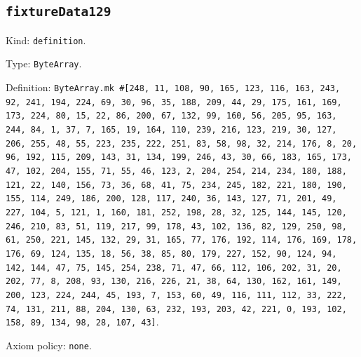\documentclass[11pt]{article}
\begin{document}
\subsection*{\texttt{fixtureData129}}
\noindent Kind: \texttt{definition}.\par
\noindent Type: \texttt{ByteArray}.\par
\noindent Definition: \texttt{ByteArray.mk \#[248, 11, 108, 90, 165, 123, 116, 163, 243, 92, 241, 194, 224, 69, 30, 96, 35, 188, 209, 44, 29, 175, 161, 169, 173, 224, 80, 15, 22, 86, 200, 67, 132, 99, 160, 56, 205, 95, 163, 244, 84, 1, 37, 7, 165, 19, 164, 110, 239, 216, 123, 219, 30, 127, 206, 255, 48, 55, 223, 235, 222, 251, 83, 58, 98, 32, 214, 176, 8, 20, 96, 192, 115, 209, 143, 31, 134, 199, 246, 43, 30, 66, 183, 165, 173, 47, 102, 204, 155, 71, 55, 46, 123, 2, 204, 254, 214, 234, 180, 188, 121, 22, 140, 156, 73, 36, 68, 41, 75, 234, 245, 182, 221, 180, 190, 155, 114, 249, 186, 200, 128, 117, 240, 36, 143, 127, 71, 201, 49, 227, 104, 5, 121, 1, 160, 181, 252, 198, 28, 32, 125, 144, 145, 120, 246, 210, 83, 51, 119, 217, 99, 178, 43, 102, 136, 82, 129, 250, 98, 61, 250, 221, 145, 132, 29, 31, 165, 77, 176, 192, 114, 176, 169, 178, 176, 69, 124, 135, 18, 56, 38, 85, 80, 179, 227, 152, 90, 124, 94, 142, 144, 47, 75, 145, 254, 238, 71, 47, 66, 112, 106, 202, 31, 20, 202, 77, 8, 208, 93, 130, 216, 226, 21, 38, 64, 130, 162, 161, 149, 200, 123, 224, 244, 45, 193, 7, 153, 60, 49, 116, 111, 112, 33, 222, 74, 131, 211, 88, 204, 130, 63, 232, 193, 203, 42, 221, 0, 193, 102, 158, 89, 134, 98, 28, 107, 43]}.\par
\noindent Axiom policy: \texttt{none}.\par
\end{document}
